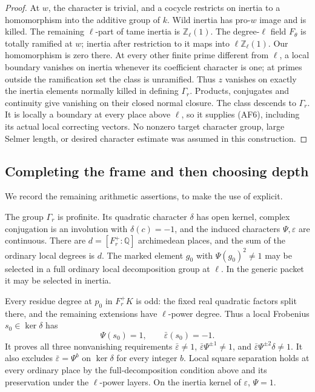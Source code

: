 \begin{proof}
At \(w\), the character is trivial, and a cocycle
restricts on inertia to a homomorphism into the
additive group of \(k\).
Wild inertia has pro-\(w\) image and is killed.
The remaining \(\ell\)-part of tame inertia is
\(\mathbb Z_\ell(1)\).
The degree-\(\ell\) field \(F_\theta\) is totally
ramified at \(w\); inertia after restriction to it
maps into \(\ell\mathbb Z_\ell(1)\).
Our homomorphism is zero there.
At every other finite prime different from \(\ell\),
a local boundary vanishes on inertia whenever its
coefficient character is one; at primes outside
the ramification set the class is unramified.
Thus \(z\) vanishes on exactly the inertia elements
normally killed in defining \(\Gamma_r\).
Products, conjugates and continuity give vanishing
on their closed normal closure.
The class descends to \(\Gamma_r\).
It is locally a boundary at every place above
\(\ell\), so it supplies (AF6), including its actual
local correcting vectors.
No nonzero target character group, large Selmer
length, or desired character estimate was assumed
in this construction.
\end{proof}

\subsection{Completing the frame and then choosing depth}
We record the remaining arithmetic assertions, to
make the use of  explicit.

The group \(\Gamma_r\) is profinite.
Its quadratic character \(\delta\) has open kernel,
complex conjugation is an involution with
\(\delta(c)=-1\), and the induced characters
\(\Psi,\varepsilon\) are continuous.
There are \(d=[F_r^+:\mathbb Q]\) archimedean places,
and the sum of the ordinary local degrees is \(d\).
The marked element \(g_0\) with \(\Psi(g_0)^2\ne1\)
may be selected in a full ordinary local decomposition
group at \(\ell\).  In the generic packet it may be
selected in inertia.

Every residue degree at \(p_0\) in \(F_r^+K\) is odd:
the fixed real quadratic factors split there, and
the remaining extensions have \(\ell\)-power degree.
Thus a local Frobenius \(s_0\in\ker\delta\) has
\[
                         \Psi(s_0)=1,\qquad
                  \bar\varepsilon(s_0)=-1 .                  \tag{AF8}
\]
It proves all three nonvanishing requirements
\(\bar\varepsilon\ne1\),
\(\bar\varepsilon\Psi^{\pm1}\ne1\), and
\(\bar\varepsilon\Psi^{\pm2}\delta\ne1\).
It also excludes
\(\bar\varepsilon=\Psi^b\) on \(\ker\delta\)
for every integer \(b\).
Local square separation holds at every ordinary place
by the full-decomposition condition above and its
preservation under the \(\ell\)-power layers.
On the inertia kernel of \(\varepsilon\), \(\Psi=1\).

